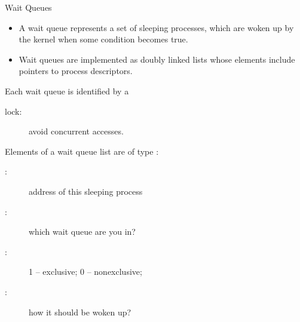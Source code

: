 \begin{frame}{Wait Queues}
  \begin{itemize}
  \item A wait queue represents a set of sleeping processes, which are woken up by the
    kernel when some condition becomes true.
  \item Wait queues are implemented as doubly linked lists whose elements include pointers
    to process descriptors.
  \end{itemize}
  \begin{block}{Each wait queue is identified by a }
    \begin{center}
    \end{center}
    \begin{description}
    \item[lock:] avoid concurrent accesses.
    \end{description}
  \end{block}
\end{frame}

\begin{frame}
  \begin{block}{Elements of a wait queue list are of type :}
    \begin{center}
    \end{center}
    \begin{description}
    \item[:] address of this sleeping process
    \item[:] which wait queue are you in?
    \item[:] 1 -- exclusive; 0 -- nonexclusive;
    \item[:] how it should be woken up?
    \end{description}
  \end{block}
\end{frame}


